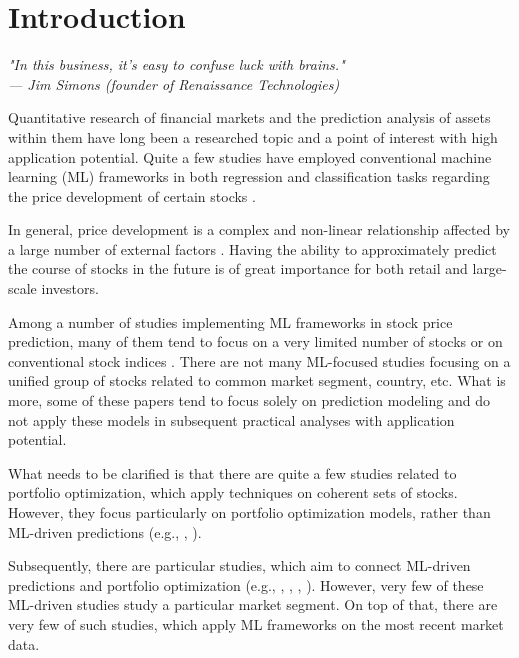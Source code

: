 \chapter*{Introduction} %
\label{introduction}

\begin{flushright}
\itshape
"In this business, it's easy to confuse luck with brains."\\
--- Jim Simons (founder of Renaissance Technologies)
\end{flushright}

Quantitative research of financial markets and the prediction analysis of assets within them have long been
a researched topic and a point of interest with high application potential. 
Quite a few studies have employed conventional machine learning (ML) frameworks in both regression and classification tasks 
regarding the price development of certain stocks \cite{review}.

In general, price development is a complex and non-linear relationship affected by a large number of external factors \cite{konferencia1}. Having the ability 
to approximately predict the course of stocks in the future is of great importance for both retail and large-scale investors. 

Among a number of studies implementing ML frameworks in stock price prediction, many of them tend to focus on a very limited number of stocks \cite{clanok5, vijh, konferencia1} or on
conventional stock indices \cite{krauss, patel}. There are not many ML-focused studies focusing on a unified group of stocks related to common market segment, country, etc. What is more, some of these papers tend to 
focus solely on prediction modeling and do not apply these models in subsequent practical analyses with application potential. 

What needs to be clarified is that there are quite a few studies related
to portfolio optimization, which apply techniques on coherent sets of stocks. However, they focus particularly on portfolio optimization models, rather than ML-driven predictions (e.g., \cite{hafner}, \cite{Ji_2024}).

Subsequently, there are particular studies, which aim to connect ML-driven predictions and portfolio optimization (e.g., \cite{chawee}, \cite{gu}, \cite{heaton}, \cite{ma}). 
However, very few of these ML-driven studies study a particular market segment. On top of that, there are very few of such studies,
which apply ML frameworks on the most recent market data.


